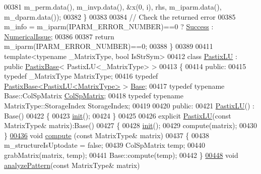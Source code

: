 \begin{DoxyCode}
00381                            m\_perm.data(), m\_invp.data(), &x(0, i), rhs, m\_iparm.data(), m\_dparm.data());
00382   \}
00383   
00384   \textcolor{comment}{// Check the returned error}
00385   m\_info = m\_iparm(IPARM\_ERROR\_NUMBER)==0 ? \hyperlink{group__enums_gga85fad7b87587764e5cf6b513a9e0ee5ea52581b035f4b59c203b8ff999ef5fcea}{Success} : \hyperlink{group__enums_gga85fad7b87587764e5cf6b513a9e0ee5eaaf9b736d310a664e7729d163a035cc5f}{NumericalIssue};
00386   
00387   \textcolor{keywordflow}{return} m\_iparm(IPARM\_ERROR\_NUMBER)==0;
00388 \}
00389 
00411 \textcolor{keyword}{template}<\textcolor{keyword}{typename} \_MatrixType, \textcolor{keywordtype}{bool} IsStrSym>
00412 \textcolor{keyword}{class }\hyperlink{class_eigen_1_1_pastix_l_u}{PastixLU} : \textcolor{keyword}{public} \hyperlink{class_eigen_1_1_pastix_base}{PastixBase}< PastixLU<\_MatrixType> >
00413 \{
00414   \textcolor{keyword}{public}:
00415     \textcolor{keyword}{typedef} \_MatrixType MatrixType;
00416     \textcolor{keyword}{typedef} \hyperlink{class_eigen_1_1_pastix_base}{PastixBase<PastixLU<MatrixType>} > 
      \hyperlink{group___sparse_core___module}{Base};
00417     \textcolor{keyword}{typedef} \textcolor{keyword}{typename} Base::ColSpMatrix \hyperlink{group___sparse_core___module}{ColSpMatrix};
00418     \textcolor{keyword}{typedef} \textcolor{keyword}{typename} MatrixType::StorageIndex StorageIndex;
00419     
00420   \textcolor{keyword}{public}:
00421     \hyperlink{class_eigen_1_1_pastix_l_u}{PastixLU}() : Base()
00422     \{
00423       \hyperlink{structinit}{init}();
00424     \}
00425     
00426     \textcolor{keyword}{explicit} \hyperlink{class_eigen_1_1_pastix_l_u}{PastixLU}(\textcolor{keyword}{const} MatrixType& matrix):Base()
00427     \{
00428       \hyperlink{structinit}{init}();
00429       compute(matrix);
00430     \}
\hyperlink{class_eigen_1_1_pastix_l_u_adc28ee2550086c7bdfe991d624bde2ee}{00436}     \textcolor{keywordtype}{void} \hyperlink{class_eigen_1_1_pastix_l_u_adc28ee2550086c7bdfe991d624bde2ee}{compute} (\textcolor{keyword}{const} MatrixType& matrix)
00437     \{
00438       m\_structureIsUptodate = \textcolor{keyword}{false};
00439       ColSpMatrix temp;
00440       grabMatrix(matrix, temp);
00441       Base::compute(temp);
00442     \}
\hyperlink{class_eigen_1_1_pastix_l_u_abae3ca7f1254106d9e2d5e0f273189fa}{00448}     \textcolor{keywordtype}{void} \hyperlink{class_eigen_1_1_pastix_l_u_abae3ca7f1254106d9e2d5e0f273189fa}{analyzePattern}(\textcolor{keyword}{const} MatrixType& matrix)

\end{DoxyCode}
